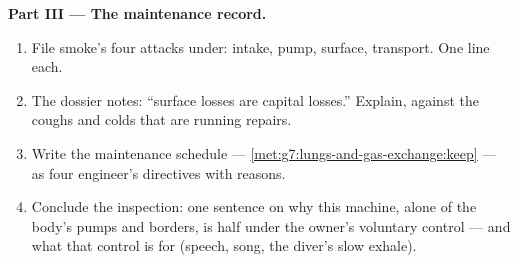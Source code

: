 \begin{problem}
\medskip\noindent\textbf{Part III --- The maintenance
record.}
\begin{enumerate}[resume]
  \item File smoke's four attacks under: intake, pump,
        surface, transport. One line each.
  \item The dossier notes: ``surface losses are
        capital losses.'' Explain, against the coughs
        and colds that are running repairs.
  \item Write the maintenance schedule ---
        \cref{met:g7:lungs-and-gas-exchange:keep} --- as
        four engineer's directives with reasons.
  \item Conclude the inspection: one sentence on why
        this machine, alone of the body's pumps and
        borders, is half under the owner's voluntary
        control --- and what that control is for
        (speech, song, the diver's slow exhale).
\end{enumerate}
\end{problem}
